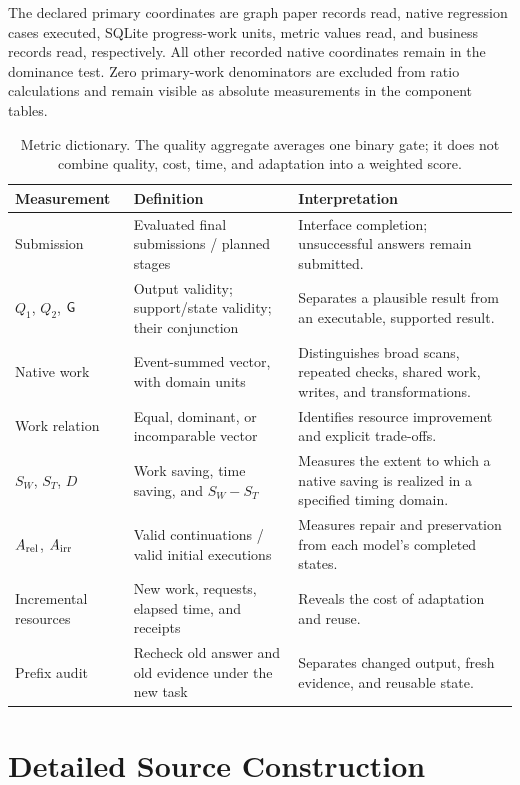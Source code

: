 The declared primary coordinates are graph paper records read, native regression cases executed, SQLite progress-work units, metric values read, and business records read, respectively. All other recorded native coordinates remain in the dominance test. Zero primary-work denominators are excluded from ratio calculations and remain visible as absolute measurements in the component tables.

\begin{table}[t]
\centering\small
\begin{tabular}{p{}p{}p{}}
\toprule
Measurement & Definition & Interpretation\\
\midrule
Submission & Evaluated final submissions / planned stages & Interface completion; unsuccessful answers remain submitted.\\
$Q_1$, $Q_2$, $\mathsf{G}$ & Output validity; support/state validity; their conjunction & Separates a plausible result from an executable, supported result.\\
Native work & Event-summed vector, with domain units & Distinguishes broad scans, repeated checks, shared work, writes, and transformations.\\
Work relation & Equal, dominant, or incomparable vector & Identifies resource improvement and explicit trade-offs.\\
$S_W$, $S_T$, $D$ & Work saving, time saving, and $S_W-S_T$ & Measures the extent to which a native saving is realized in a specified timing domain.\\
$A_{\rm rel}$, $A_{\rm irr}$ & Valid continuations / valid initial executions & Measures repair and preservation from each model's completed states.\\
Incremental resources & New work, requests, elapsed time, and receipts & Reveals the cost of adaptation and reuse.\\
Prefix audit & Recheck old answer and old evidence under the new task & Separates changed output, fresh evidence, and reusable state.\\
\bottomrule
\end{tabular}
\caption{Metric dictionary. The quality aggregate averages one binary gate; it does not combine quality, cost, time, and adaptation into a weighted score.}
\end{table}

\section{Detailed Source Construction}
\label{app:sources}
